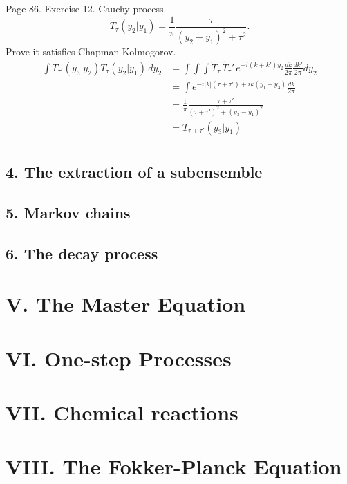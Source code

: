\documentclass{book}
\begin{document}
Page 86.
Exercise 12.
Cauchy process.
\begin{equation}
  T_\tau(y_2|y_1)
  =
  \frac{1}{\pi}
  \frac{ \tau } { (y_2 - y_1)^2 + \tau^2 }.
\end{equation}
Prove it satisfies Chapman-Kolmogorov.
$$
\begin{aligned}
\int T_{\tau'}(y_3|y_2) T_\tau(y_2|y_1) \, dy_2
&=
\int \int \int \tilde T_\tau \, \tilde T_\tau' \,
e^{-i(k + k') y_2 } \frac{dk}{2\pi} \frac{dk'}{2\pi} dy_2
\\
&=
\int e^{ -i|k| (\tau +\tau') + ik (y_1 -y_3) } \frac{dk}{2\pi}
\\
&=
\frac{1}{\pi}
\frac{ \tau + \tau'}
{ (\tau + \tau')^2 + (y_3 - y_1)^2 } \\
&=
T_{\tau + \tau'}(y_3 | y_1) \\
\end{aligned}
$$



\section{4. The extraction of a subensemble}

\section{5. Markov chains}

\section{6. The decay process}


\chapter{V. The Master Equation}


\chapter{VI. One-step Processes}


\chapter{VII. Chemical reactions}


\chapter{VIII. The Fokker-Planck Equation}
\end{document}
